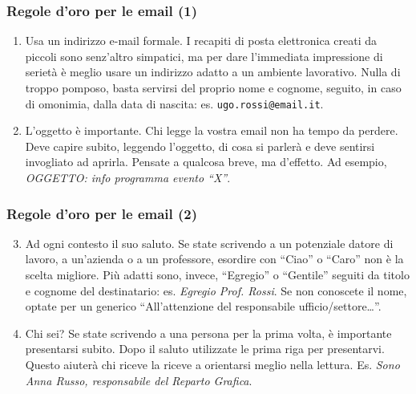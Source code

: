 \documentclass[]{beamer}
\begin{document}
\begin{frame}
\frametitle{Regole d'oro per le email (1)}
\begin{enumerate}
  \item \alert{Usa un indirizzo e-mail formale.} I recapiti di posta elettronica creati da piccoli sono senz'altro simpatici, ma per dare l’immediata impressione di serietà è meglio usare un indirizzo adatto a un ambiente lavorativo. Nulla di troppo pomposo, basta servirsi del proprio nome e cognome, seguito, in caso di omonimia, dalla data di nascita: es. \texttt{ugo.rossi@email.it}.\pause
  \item \alert{L’oggetto è importante.} Chi legge la vostra email non ha tempo da perdere. Deve capire subito, leggendo l’oggetto, di cosa si parlerà e deve sentirsi invogliato ad aprirla. Pensate a qualcosa breve, ma d’effetto. Ad esempio, \emph{OGGETTO: info programma evento ``X''}.
\end{enumerate}
\end{frame}



\begin{frame}
\frametitle{Regole d'oro per le email (2)}
\begin{enumerate}\setcounter{enumi}{2}
  \item \alert{Ad ogni contesto il suo saluto.} Se state scrivendo a un potenziale datore di lavoro, a un’azienda o a un professore, esordire con ``Ciao'' o ``Caro'' non è la scelta migliore. Più adatti sono, invece, ``Egregio'' o ``Gentile'' seguiti da titolo e cognome del destinatario: es. \emph{Egregio Prof. Rossi}. Se non conoscete il nome, optate per un generico ``All’attenzione del responsabile ufficio/settore\ldots''.\pause
  \item \alert{Chi sei?} Se state scrivendo a una persona per la prima volta, è importante presentarsi subito. Dopo il saluto utilizzate le prima riga per presentarvi. Questo aiuterà chi riceve la riceve a orientarsi meglio nella lettura. Es. \emph{Sono Anna Russo, responsabile del Reparto Grafica}.
\end{enumerate}
\end{frame}
\end{document}
